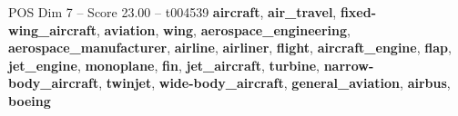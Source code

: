 \begin{textsample}{POS Dim 7 – Score 23.00 – t004539}  \label{ex:f7_pos_010}
\textbf{aircraft}, \textbf{air\_travel}, \textbf{fixed-wing\_aircraft}, \textbf{aviation}, \textbf{wing}, \textbf{aerospace\_engineering}, \textbf{aerospace\_manufacturer}, \textbf{airline}, \textbf{airliner}, \textbf{flight}, \textbf{aircraft\_engine}, \textbf{flap}, \textbf{jet\_engine}, \textbf{monoplane}, \textbf{fin}, \textbf{jet\_aircraft}, \textbf{turbine}, \textbf{narrow-body\_aircraft}, \textbf{twinjet}, \textbf{wide-body\_aircraft}, \textbf{general\_aviation}, \textbf{airbus}, \textbf{boeing}

\end{textsample}
